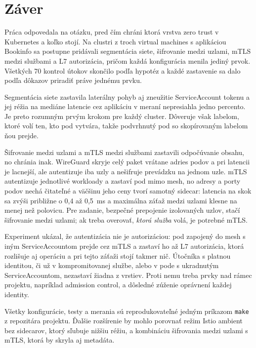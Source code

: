 \chapter*{Záver}
{}

Práca odpovedala na otázku, pred čím chráni ktorá vrstva zero trust v Kubernetes a koľko stojí. Na clustri z troch virtual machines s aplikáciou Bookinfo sa postupne pridávali segmentácia siete, šifrovanie medzi uzlami, mTLS medzi službami a L7 autorizácia, pričom každá konfigurácia menila jediný prvok. Všetkých 70 kontrol útokov skončilo podľa hypotéz a každé zastavenie sa dalo podľa dôkazov priradiť práve jednému prvku.

Segmentácia siete zastavila laterálny pohyb aj zneužitie ServiceAccount tokenu a jej réžia na mediáne latencie cez aplikáciu v meraní nepresiahla jedno percento. Je preto rozumným prvým krokom pre každý cluster. Dôveruje však labelom, ktoré volí ten, kto pod vytvára, takže podvrhnutý pod so skopírovaným labelom ňou prejde.

Šifrovanie medzi uzlami a mTLS medzi službami zastavili odpočúvanie obsahu, no chránia inak. WireGuard skryje celý paket vrátane adries podov a pri latencii je lacnejší, ale autentizuje iba uzly a nešifruje prevádzku na jednom uzle. mTLS autentizuje jednotlivé workloady a zastaví pod mimo mesh, no adresy a porty podov nechá čitateľné a väčšinu jeho ceny tvorí samotný sidecar: latencia na skok sa zvýši približne o 0,4 až 0,5~ms a maximálna záťaž medzi uzlami klesne na menej než polovicu. Pre zadanie, bezpečné prepojenie izolovaných uzlov, stačí šifrovanie medzi uzlami; ak treba overovať, \emph{ktorá služba} volá, je potrebné mTLS.

Experiment ukázal, že autentizácia nie je autorizáciou: pod zapojený do mesh s iným ServiceAccountom prejde cez mTLS a zastaví ho až L7 autorizácia, ktorá rozlišuje aj operáciu a pri tejto záťaži stojí takmer nič. Útočníka s platnou identitou, či už v kompromitovanej službe, alebo v pode s ukradnutým ServiceAccountom, nezastaví žiadna z vrstiev. Proti nemu treba prvky nad rámec projektu, napríklad admission control, a dôsledné zúženie oprávnení každej identity.

Všetky konfigurácie, testy a merania sú reprodukovateľné jedným príkazom \texttt{make} z repozitára projektu. Ďalšie rozšírenie by mohlo porovnať režim Istio ambient bez sidecarov, ktorý sľubuje nižšiu réžiu, a kombináciu šifrovania medzi uzlami s mTLS, ktorá by skryla aj metadáta.
